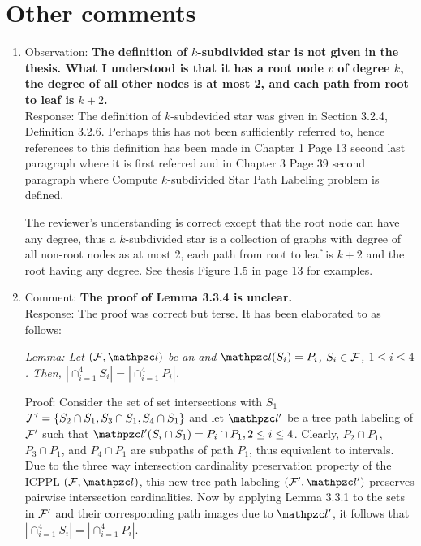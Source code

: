 \documentclass{article}
\begin{document}
\section{Other comments}
\begin{enumerate}
\item Observation: {\bf The definition of $k$-subdivided star is not
    given in the thesis. What I understood is that it has a root node $v$
    of degree $k$, the degree of all other nodes is at most 2, and
    each path from root to leaf is $k+2$.}\\
Response: The definition of $k$-subdevided star was given in Section
3.2.4, Definition 3.2.6. Perhaps this has not been sufficiently
referred to, hence references to this definition has been made in
Chapter 1 Page 13 second last paragraph where it is first referred and
in Chapter 3 Page 39 second paragraph where {\sc Compute
  $k$-subdivided Star Path Labeling} problem is defined.

The reviewer's understanding is 
correct except that the root node can have any degree, thus a
$k$-subdivided star is a collection of graphs with degree of all
non-root nodes as at most 2, each path from root to leaf is $k+2$ and 
the root having any degree. See thesis Figure 1.5 in page 13 for examples.


\item Comment: {\bf The proof of Lemma 3.3.4 is unclear.}\\
Response: The proof was correct but terse. It has been elaborated to as
follows:

  {\em 
  Lemma:   Let $(\cF, \cl)$ be an \ICPPL and $\cl(S_i)=P_i$, $S_i \in {\cal F}$, $1
  \leq i \leq 4$.  Then, $|\cap_{i=1}^4 S_i| = |\cap_{i=1}^4 P_i|$.

  Proof: Consider the set of set intersections with $S_1$ ${\cal F}' = \{S_2 \cap S_1, S_3
  \cap S_1, S_4 \cap S_1\}$ and let $\cl'$ be a tree path labeling of
  ${\cal F}'$ such that $\cl'(S_i \cap S_1) = P_i \cap P_1, 2 \le i \le
  4$. Clearly, $P_2 \cap P_1$, $P_3 \cap P_1$, and $P_4 \cap P_1$ are
  subpaths of path $P_1$, thus equivalent to intervals.  Due to the
  three way intersection cardinality preservation property of the
  ICPPL $(\cF, \cl)$, this new tree path labeling $(\cF', \cl')$
  preserves pairwise intersection cardinalities.  Now by applying
  Lemma 3.3.1 %
  to the sets in ${\cal F}'$ and
  their corresponding path images due to $\cl'$, it follows that
  $|\cap_{i=1}^4 S_i| =| \cap_{i=1}^4 P_i|$.}



\end{enumerate}
\end{document}
